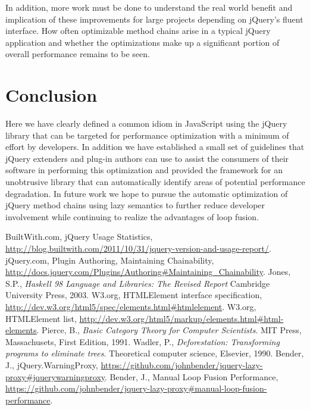 \documentclass[preprint]{sigplanconf}
\begin{document}
In addition, more work must be done to understand the real world benefit and implication of these improvements for large projects depending on jQuery's fluent interface. How often optimizable method chains arise in a typical jQuery application and whether the optimizations make up a significant portion of overall performance remains to be seen.

\section{Conclusion}

Here we have clearly defined a common idiom in JavaScript using the jQuery library that can be targeted for performance optimization with a minimum of effort by developers. In addition we have established a small set of guidelines that jQuery extenders and plug-in authors can use to assist the consumers of their software in performing this optimization and provided the framework for an unobtrusive library that can automatically identify areas of potential performance degradation. In future work we hope to pursue the automatic optimization of jQuery method chains using lazy semantics to further reduce developer involvement while continuing to realize the advantages of loop fusion.




\begin{thebibliography}{}
\softraggedright

  BuiltWith.com,
  jQuery Usage Statistics,
  \url{http://blog.builtwith.com/2011/10/31/jquery-version-and-usage-report/}.
  jQuery.com,
  Plugin Authoring,
  Maintaining Chainability,
  \url{http://docs.jquery.com/Plugins/Authoring#Maintaining_Chainability}.
  Jones, S.P.,
  \emph{Haskell 98 Language and Libraries: The Revised Report}
  Cambridge University Press,
  2003.
  W3.org,
  HTMLElement interface specification,
  \url{http://dev.w3.org/html5/spec/elements.html#htmlelement}.
  W3.org,
  HTMLElement list,
  \url{http://dev.w3.org/html5/markup/elements.html#html-elements}.
  Pierce, B.,
  \emph{Basic Category Theory for Computer Scientists}.
  MIT Press, Massachusets,
  First Edition,
  1991.
  Wadler, P.,
  \emph{Deforestation: Transforming programs to eliminate trees}.
  Theoretical computer science,
  Elsevier,
  1990.
  Bender, J.,
  jQuery.WarningProxy,
  \url{https://github.com/johnbender/jquery-lazy-proxy#jquerywarningproxy}.
  Bender, J.,
  Manual Loop Fusion Performance,
  \url{https://github.com/johnbender/jquery-lazy-proxy#manual-loop-fusion-performance}.



\end{thebibliography}
\end{document}
